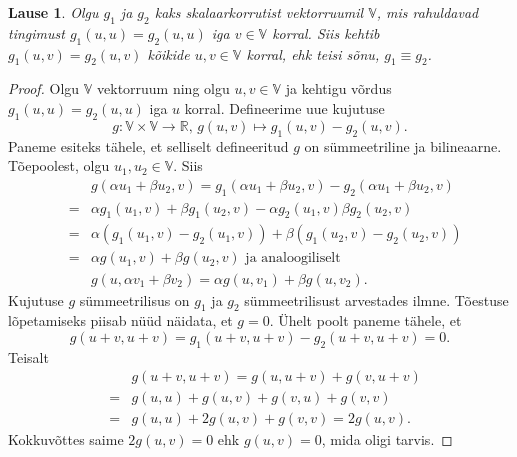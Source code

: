 \documentclass[a4paper,12pt]{article}
\newtheorem{lause}{Lause}[section]
\numberwithin{equation}{section}
\begin{document}
\begin{lause} \label{lause:skalaarkorrutise-yhesus}
Olgu $g_1$ ja $g_2$ kaks skalaarkorrutist vektorruumil $\mathbb{V}$, mis rahuldavad tingimust $g_1 \left(u, u \right) = g_2 \left(u, u \right)$ iga $v \in \mathbb{V}$ korral. Siis kehtib $g_1 \left(u, v \right) = g_2 \left(u, v \right)$ kõikide $u, v \in \mathbb{V}$ korral, ehk teisi sõnu, $g_1 \equiv g_2$.
\end{lause}

\begin{proof}
Olgu $\mathbb{V}$ vektorruum ning olgu $u, v \in \mathbb{V}$ ja kehtigu võrdus $g_1 \left(u, u\right) = g_2 \left(u, u\right)$ iga $u$ korral. Defineerime uue kujutuse
\begin{equation*}
g: \mathbb{V} \times \mathbb{V} \rightarrow \mathbb{R} \text{, } g\left(u, v\right) \mapsto g_1\left(u, v\right) - g_2\left(u, v\right).
\end{equation*}
Paneme esiteks tähele, et selliselt defineeritud $g$ on sümmeetriline ja bilineaarne. Tõepoolest, olgu $u_1, u_2 \in \mathbb{V}$. Siis
\begin{eqnarray*}
&& g\left( \alpha u_1 + \beta u_2, v \right) = g_1\left( \alpha u_1 + \beta u_2, v \right) - g_2\left( \alpha u_1 + \beta u_2, v \right) \\
&=& \alpha g_1 \left(u_1, v\right) + \beta g_1 \left(u_2, v \right) -\alpha g_2 \left(u_1, v\right)  \beta g_2 \left(u_2, v \right) \\
&=& \alpha \left( g_1 \left(u_1, v\right) - g_2 \left(u_1, v \right)\right) + \beta \left( g_1 \left(u_2, v\right) - g_2 \left(u_2, v \right)\right) \\
&=& \alpha g\left( u_1, v \right) + \beta g\left( u_2, v\right) \text{ ja analoogiliselt} \\
&& g\left( u, \alpha v_1 + \beta v_2 \right) = \alpha g\left( u, v_1 \right) + \beta g\left( u, v_2\right).
\end{eqnarray*}
Kujutuse $g$ sümmeetrilisus on $g_1$ ja $g_2$ sümmeetrilisust arvestades ilmne. Tõestuse lõpetamiseks piisab nüüd näidata, et $g = 0$. Ühelt poolt paneme tähele, et
\begin{equation*}
g \left(u+v, u+v\right) = g_1 \left(u+v, u+v\right) - g_2 \left(u+v, u+v\right) = 0.
\end{equation*}
Teisalt
\begin{eqnarray*}
&& g \left(u+v, u+v\right) = g \left(u, u+v\right) + g \left(v, u+v\right) \\
&=& g \left(u, u\right) + g \left(u, v\right) + g \left(v, u\right) + g \left(v, v\right) \\
&=& g \left(u, u\right) + 2g \left(u, v\right) + g \left(v, v\right) = 2g \left(u, v\right).
\end{eqnarray*}
Kokkuvõttes saime $2g\left(u, v\right) = 0$ ehk $g\left(u, v\right) = 0$, mida oligi tarvis.
\end{proof}
\end{document}
